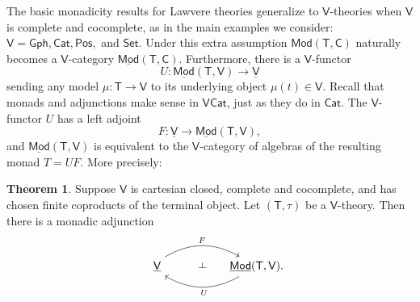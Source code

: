 \documentclass{amsart}
\theoremstyle{definition}
\newtheorem{theorem}{Theorem}
\def\ld{\rotatebox[origin=c]{-90}{$\dashv$}} %
\newcommand{\Gph}{\mathsf{Gph}}
\newcommand{\Set}{\mathsf{Set}}
\newcommand{\Cat}{\mathsf{Cat}}
\newcommand{\Pos}{\mathsf{Pos}}
\newcommand{\Mod}{\mathsf{Mod}}
\newcommand{\V}{\mathsf{V}}
\newcommand{\C}{\mathsf{C}}
\newcommand{\T}{\mathsf{T}}
\newcommand{\maps}{\colon}
\begin{document}
The basic monadicity results for Lawvere theories generalize to $\V$-theories when $\V$ is  complete and cocomplete, as in the main examples we consider: $\V = \Gph, \Cat, \Pos,$ and $\Set$.   Under this extra assumption $\Mod(\T,\C)$ naturally becomes a $\V$-category $\underline{\Mod}(\T,\C)$.  Furthermore, there is a $\V$-functor 
\[   U \maps \underline{\Mod}(\T,\V) \to \underline{\V} \]
sending any model  $\mu \maps \T \to \V$ to its underlying object $\mu(t) \in \V$.   
Recall that monads and adjunctions make sense in $\V\Cat$, just as they do in $\Cat$.  
The $\V$-functor $U$ has a left adjoint
\[   F \maps \underline{\V} \to \underline{\Mod}(\T,\V) ,\]
and $\underline{\Mod}(\T,\V)$ is equivalent to the $\V$-category of algebras of the resulting monad $T = UF$.  More precisely:

\begin{theorem}
\label{thm:monadicity}
Suppose $\V$ is cartesian closed, complete and cocomplete, and has chosen finite coproducts of the terminal object.  Let $(\T,\tau)$ be a $\V$-theory.  Then there is a monadic adjunction
\[\begin{tikzcd}[column sep=small]
\phantom{AA} \underline{\V} \arrow[bend left,below]{rr}{F}
& {\phantom{Aa} \ld} &
\arrow[bend left,above]{ll}{\;\, U} \underline{\Mod}(\T,\V).
\end{tikzcd}\]
\end{theorem}
\end{document}
